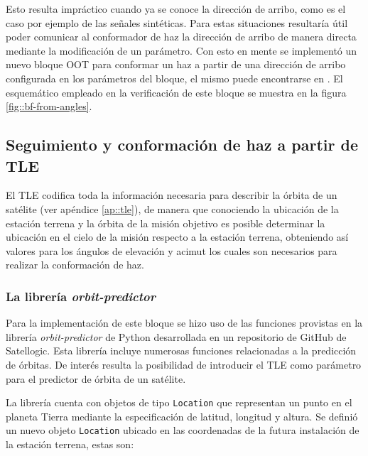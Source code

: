 \documentclass[../../main.tex]{subfiles}
\begin{document}
Esto resulta impráctico cuando ya se conoce la dirección de arribo, como es el caso por ejemplo de las señales sintéticas. Para estas situaciones resultaría útil poder comunicar al conformador de haz la dirección de arribo de manera directa mediante la modificación de un parámetro. Con esto en mente se implementó un nuevo bloque OOT para conformar un haz a partir de una dirección de arribo configurada en los parámetros del bloque, el mismo puede encontrarse en . El esquemático empleado en la verificación de este bloque se muestra en la figura \ref{fig::bf-from-angles}.




\subsection{Seguimiento y conformación de haz a partir de TLE}
El TLE codifica toda la información necesaria para describir la órbita de un satélite (ver apéndice \ref{ap::tle}), de manera que conociendo la ubicación de la estación terrena y la órbita de la misión objetivo es posible determinar la ubicación en el cielo de la misión respecto a la estación terrena, obteniendo así valores para los ángulos de elevación y acimut los cuales son necesarios para realizar la conformación de haz.

\subsubsection{La librería \textit{orbit-predictor}}
Para la implementación de este bloque se hizo uso de las funciones provistas en la librería \textit{orbit-predictor} de Python desarrollada en un repositorio de GitHub de Satellogic\cite{orbit-predictor}. Esta librería incluye numerosas funciones relacionadas a la predicción de órbitas. De interés resulta la posibilidad de introducir el TLE como parámetro para el predictor de órbita de un satélite.

La librería cuenta con objetos de tipo \texttt{Location} que representan un punto en el planeta Tierra mediante la especificación de latitud, longitud y altura. Se definió un nuevo objeto \texttt{Location} ubicado en las coordenadas de la futura instalación de la estación terrena, estas son:
\end{document}
